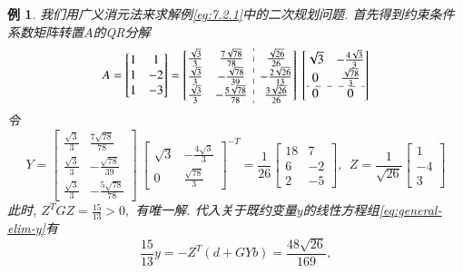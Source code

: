 \documentclass{SBCbookchapter}
\newtheorem{eg}[thm]{例}
\numberwithin{equation}{section}
\begin{document}
\begin{eg}
\label{eg:7.2.2}
我们用广义消元法来求解例\eqref{eg:7.2.1}中的二次规划问题. 首先得到约束条件系数矩阵转置$A$的QR分解
\begin{equation*}
A = \begin{bmatrix} 1 & 1 \\ 1 & -2 \\ 1 & -3 \end{bmatrix} = \left[\begin{array}{@{}cc:c@{}} \frac{\sqrt{3}}{3} & \frac{7 \sqrt{78}}{78} & \frac{\sqrt{26}}{26} \\ \frac{\sqrt{3}}{3} & - \frac{\sqrt{78}}{39} & - \frac{2 \sqrt{26}}{13} \\ \frac{\sqrt{3}}{3} & - \frac{5 \sqrt{78}}{78} & \frac{3 \sqrt{26}}{26} \end{array}\right] ~ \left[\begin{array}{@{}cc@{}} \sqrt{3} & - \frac{4 \sqrt{3}}{3} \\ 0 & \frac{\sqrt{78}}{3} \\ \hdashline 0 & 0 \end{array}\right]
\end{equation*}
令
\begin{equation*}
Y = \left[\begin{matrix} \frac{\sqrt{3}}{3} & \frac{7 \sqrt{78}}{78} \\ \frac{\sqrt{3}}{3} & - \frac{\sqrt{78}}{39} \\ \frac{\sqrt{3}}{3} & - \frac{5 \sqrt{78}}{78} \end{matrix}\right] ~ \left[\begin{matrix} \sqrt{3} & - \frac{4 \sqrt{3}}{3} \\ 0 & \frac{\sqrt{78}}{3} \end{matrix}\right]^{-T} = \frac{1}{26} \left[\begin{matrix} 18 & 7 \\ 6 & -2 \\ 2 & -5 \end{matrix}\right], ~~ Z = \frac{1}{\sqrt{26}} \left[\begin{matrix} 1 \\ -4 \\ 3 \end{matrix}\right]
\end{equation*}
此时, $Z^T G Z = \frac{15}{13} > 0,$ 有唯一解. 代入关于既约变量$y$的线性方程组\eqref{eq:general-elim-y}有
\begin{equation*}
\frac{15}{13} y = - Z^T \left( d + G Y b \right) = \frac{48 \sqrt{26}}{169},

\end{equation*}
\end{eg}
\end{document}
